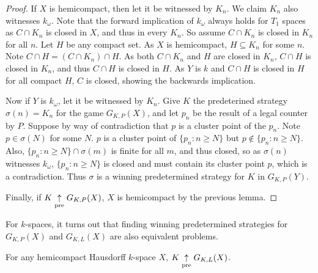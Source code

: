 \begin{proof}
If $X$ is hemicompact, then let it be witnessed by $K_n$. We claim $K_n$ also witnesses $k_\omega$. Note that the forward implication of $k_\omega$ always holds for $T_1$ spaces as $C\cap K_n$ is closed in $X$, and thus in every $K_n$. So assume $C\cap K_n$ is closed in $K_n$ for all $n$. Let $H$ be any compact set. As $X$ is hemicompact, $H\subseteq K_n$ for some $n$. Note $C\cap H = (C\cap K_n)\cap H$. As both $C \cap K_n$ and $H$ are closed in $K_n$, $C\cap H$ is closed in $K_n$, and thus $C\cap H$ is closed in $H$. As $Y$ is $k$ and $C\cap H$ is closed in $H$ for all compact $H$, $C$ is closed, showing the backwards implication.

Now if $Y$ is $k_\omega$, let it be witnessed by $K_n$. Give $K$ the predeterined strategy $\sigma(n)=K_n$ for the game $G_{K,P}(X)$, and let $p_n$ be the result of a legal counter by $P$. Suppose by way of contradiction that $p$ is a cluster point of the $p_n$. Note $p\in \sigma(N)$ for some $N$. $p$ is a cluster point of $\{p_n : n\geq N\}$ but $p\not\in \{p_n : n \geq N\}$. Also, $\{p_n : n \geq N\} \cap \sigma(m)$ is finite for all $m$, and thus closed, so as $\sigma(n)$ witnesses $k_\omega$, $\{p_n : n\geq N\}$ is closed and must contain its cluster point $p$, which is a contradiction. Thus $\sigma$ is a winning predetermined strategy for $K$ in $G_{K,P}(Y)$.

Finally, if $K \underset{\text{pre}}{\uparrow} G_{K,P}(X)$, $X$ is hemicompact by the previous lemma.
\end{proof}

For $k$-spaces, it turns out that finding winning predetermined strategies for $G_{K,P}(X)$ and $G_{K,L}(X)$ are also equivalent problems.

\begin{theorem}
For any hemicompact Hausdorff $k$-space $X$, $K \underset{\text{pre}}{\uparrow} G_{K,L}(X)$.
\end{theorem}

